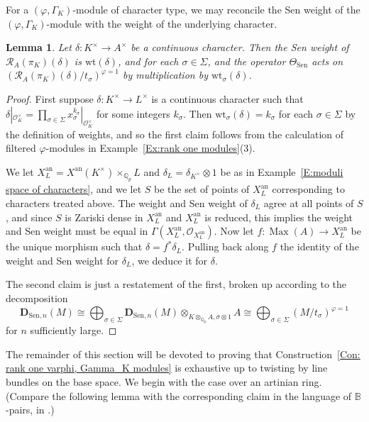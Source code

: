 \documentclass[12pt]{article}
\newtheorem{lemma}[theorem]{Lemma}
\theoremstyle{definition}
\numberwithin{equation}{theorem}
\newcommand{\calO}{\mathcal{O}}
\newcommand{\calR}{\mathcal{R}}
\newcommand{\BB}{\mathbb{B}}
\newcommand{\QQ}{\mathbb{Q}}
\newcommand{\bbD}{\mathbf{D}}
\newcommand{\an}{\mathrm{an}}
\def\Qp{\QQ_p}
\newcommand{\Sen}{\mathrm{Sen}}
\DeclareMathOperator{\Max}{Max}
\begin{document}
For a $(\varphi, \Gamma_K)$-module of character type, we may
reconcile the Sen weight of the $(\varphi, \Gamma_K)$-module
with the weight of the underlying character.

\begin{lemma}
\label{L:weight of rank one module}
Let $\delta:K^\times \to A^\times$ be a continuous character.  Then
the Sen weight of $\calR_A(\pi_K)(\delta)$ is $\mathrm{wt}(\delta)$,
and for each $\sigma \in \Sigma$, and the operator $\Theta_\Sen$ acts
on $(\calR_A(\pi_K)(\delta)/t_\sigma)^{\varphi=1}$ by multiplication
by $\mathrm{wt}_\sigma(\delta)$.
\end{lemma}
\begin{proof}
First suppose $\delta: K^\times \to L^\times $ is a continuous
character such that $\delta|_{\calO_K^\times} = \prod_{\sigma \in
  \Sigma} x_\sigma^{k_\sigma}|_{\calO_K^\times}$ for some integers
$k_\sigma$.  Then $\mathrm{wt}_\sigma(\delta) = k_\sigma$ for each
$\sigma \in \Sigma$ by the definition of weights, and so the first
claim follows from the calculation of filtered $\varphi$-modules in
Example~\ref{Ex:rank one modules}(3).

We let $X_L^\an = X^\an(K^\times) \times_{\Qp} L$ and $\delta_L =
\delta_{K^\times} \otimes 1$ be as in Example~\ref{E:moduli space of
  characters}, and we let $S$ be the set of points of $X_L^\an$
corresponding to characters treated above.  The weight and Sen weight
of $\delta_L$ agree at all points of $S$, and since $S$ is Zariski
dense in $X_L^\an$ and $X_L^\an$ is reduced, this implies the weight
and Sen weight must be equal in $\Gamma(X_L^\an,\calO_{X_L^\an})$.
Now let $f : \Max(A) \to X_L^\an$ be the unique morphism such that
$\delta = f^*\delta_L$.  Pulling back along $f$ the identity of the
weight and Sen weight for $\delta_L$, we deduce it for $\delta$.

The second claim is just a restatement of the first, broken up
according to the decomposition
\[
\bbD_{\Sen, n}(M) \cong \bigoplus_{\sigma \in \Sigma} \bbD_{\Sen, n}(M) \otimes_{K \otimes_{\Qp} A, \sigma \otimes 1} A \cong
\bigoplus_{\sigma \in \Sigma} (M/t_\sigma)^{\varphi = 1}
\]
for $n$ sufficiently large.
\end{proof}

The remainder of this section will be devoted to proving that
Construction~\ref{Con: rank one varphi, Gamma_K modules} is exhaustive up to twisting by line bundles on the base space. We begin with the case over an artinian ring. (Compare
the following lemma with the corresponding claim in the language of
$\BB$-pairs, in \cite[Proposition~2.15]{nakamura2}.)
\end{document}

